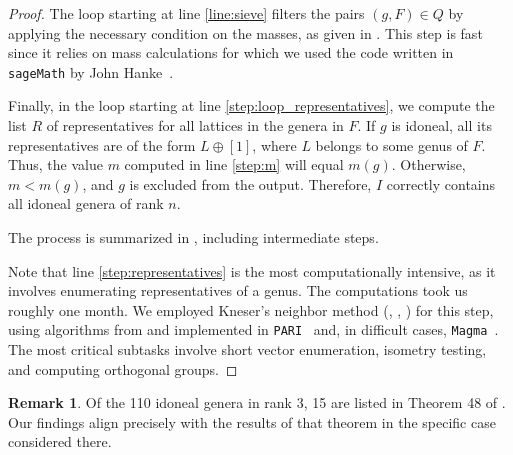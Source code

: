 \documentclass[a4paper]{amsart}
\theoremstyle{definition}
\newtheorem{remark}[definition]{Remark}
\theoremstyle{plain}
\begin{document}
\begin{proof}
    The loop starting at line \ref{line:sieve} filters the pairs \((g, F) \in Q\) by applying the necessary condition on the masses, as given in . This step is fast since it relies on mass calculations for which we used the code written in \verb+sageMath+ by John Hanke~\cite{hanke}.

    Finally, in the loop starting at line \ref{step:loop_representatives}, we compute the list \(R\) of representatives for all lattices in the genera in \(F\). If \(g\) is idoneal, all its representatives are of the form \(L \oplus [1]\), where \(L\) belongs to some genus of \(F\). Thus, the value \(m\) computed in line \ref{step:m} will equal \(m(g)\). Otherwise, \(m < m(g)\), and \(g\) is excluded from the output. Therefore, \(I\) correctly contains all idoneal genera of rank \(n\).

    The process is summarized in , including intermediate steps. 
    
    Note that line \ref{step:representatives} is the most computationally intensive, as it involves enumerating representatives of a genus. 
    The computations took us roughly one month. We employed Kneser's neighbor method (\cite[§28]{kneser}, \cite{neighbor}, \cite{kirschmer}) for this step, using algorithms from \cite{fincke.pohst} and \cite{isometries} implemented in \verb+PARI+~\cite{pari} and, in difficult cases, \verb+Magma+~\cite{magma}. The most critical subtasks involve short vector enumeration, isometry testing, and computing orthogonal groups.
\end{proof}

\begin{remark}
    Of the 110 idoneal genera in rank \(3\), 15 are listed in Theorem 48 of \cite{Kani:idoneal.numbers}. Our findings align precisely with the results of that theorem in the specific case considered there.
\end{remark}
\end{document}
